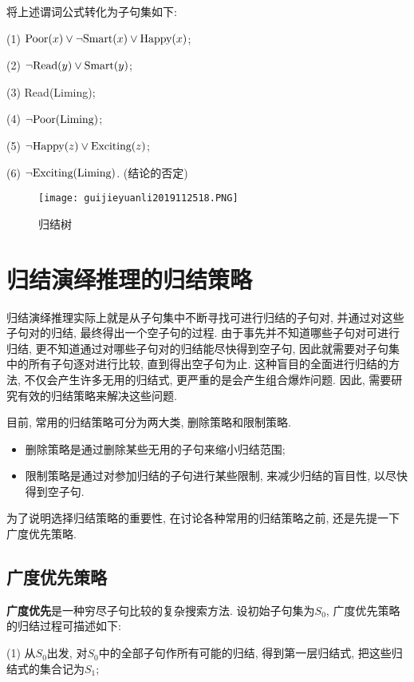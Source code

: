 将上述谓词公式转化为子句集如下:

\qquad (1) $\textup{Poor}(x)\vee \neg \textup{Smart}(x)\vee \textup{Happy}(x)$;

\qquad (2) $\neg \textup{Read}(y)\vee \textup{Smart}(y)$;

\qquad (3) \textup{Read}(Liming);

\qquad (4) $\neg \textup{Poor}(\textup{Liming})$;

\qquad (5) $\neg \textup{Happy}(z)\vee \textup{Exciting}(z)$;

\qquad (6) $\neg \textup{Exciting}(\textup{Liming})$. (结论的否定)

\begin{figure}[H]
    \centering
    \texttt{[image: guijieyuanli2019112518.PNG]}
    \caption{归结树}
    \label{AI32fig18}
\end{figure}
\section{归结演绎推理的归结策略}
    归结演绎推理实际上就是从子句集中不断寻找可进行归结的子句对, 并通过对这些子句对的归结, 最终得出一个空子句的过程. 由于事先并不知道哪些子句对可进行归结, 更不知道通过对哪些子句对的归结能尽快得到空子句, 因此就需要对子句集中的所有子句逐对进行比较, 直到得出空子句为止. 这种盲目的全面进行归结的方法, 不仅会产生许多无用的归结式, 更严重的是会产生组合爆炸问题. 因此, 需要研究有效的归结策略来解决这些问题.

目前, 常用的归结策略可分为两大类, 删除策略和限制策略.
\begin{itemize}
    \item 删除策略是通过删除某些无用的子句来缩小归结范围;
    \item 限制策略是通过对参加归结的子句进行某些限制, 来减少归结的盲目性, 以尽快得到空子句.
\end{itemize}

为了说明选择归结策略的重要性, 在讨论各种常用的归结策略之前, 还是先提一下广度优先策略.
\subsection{广度优先策略}
\textbf{广度优先}是一种穷尽子句比较的复杂搜索方法. 设初始子句集为$S_0$, 广度优先策略的归结过程可描述如下:

(1) 从$S_0$出发, 对$S_0$中的全部子句作所有可能的归结, 得到第一层归结式, 把这些归结式的集合记为$S_1$;

